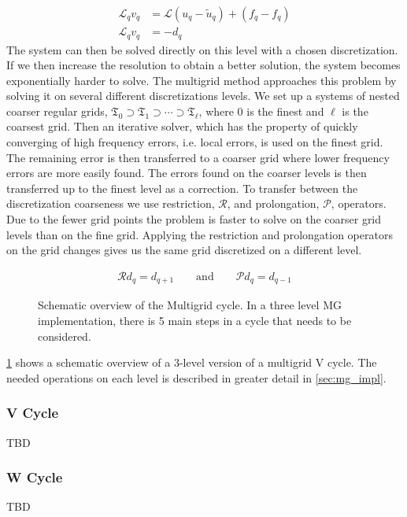 	\begin{align}
		\mathcal{L}_q v_q &= \mathcal{L}(u_q - \tilde{u}_q)  + (f_q- f_q)
		\\
		\mathcal{L}_q v_q &= - d_q \label{eq:diff_MG}
	\end{align}
	The system can then be solved directly on this level with a chosen discretization.
	If we then increase the resolution to obtain a better solution, the system
	becomes exponentially harder to solve. The multigrid method approaches this problem
	by solving it on several different discretizations levels.
	We set up a systems of nested coarser regular grids,
	\(\mathfrak{T}_0 \supset \mathfrak{T}_{1} \supset \cdots \supset \mathfrak{T}_\ell\),
	where \(0\) is the finest and \(\ell\) is the coarsest grid.
	Then an iterative solver, which has the property of quickly converging of high frequency errors, i.e.
	local errors, is used on the finest grid. The remaining error is then transferred
	to a coarser grid where lower frequency errors are more easily found. The errors
	found on the coarser levels is then transferred up to the finest level as a correction.
	To transfer between the discretization coarseness we use restriction, \( \mathcal{R} \),
	and prolongation, \( \mathcal{P} \), operators. Due to the fewer grid points the problem is
	faster to solve on the coarser grid levels than on the fine grid.
	Applying the restriction and prolongation operators on the grid changes gives us
	the same grid discretized on a different level.

	\begin{align}
		\mathcal{R} d_q = d_{q+1} \qquad \text{and} \qquad \mathcal{P} d_q = d_{q - 1}
	\end{align}

	\begin{figure}
	    \center
		
		\caption{Schematic overview of the Multigrid cycle. In a three level MG implementation,
		there is 5 main steps in a cycle that needs to be considered.}
		\label{fig:MG_schematic}
	\end{figure}

	\cref{fig:MG_schematic} shows a schematic overview of a \(3\)-level
	version of a multigrid V cycle. The needed operations on each
	level is described in greater detail in \cref{sec:mg_impl}.

	\subsubsection{V Cycle}
		TBD
	\subsubsection{W Cycle}
		TBD
